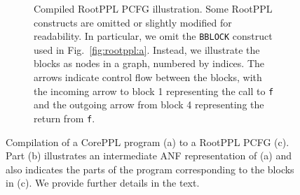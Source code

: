\documentclass[runningheads]{llncs}
\newcommand{\rlstinline}{\lstinline[language=RootPPL]}
\begin{document}
\begin{figure}[tbp]
\begin{subfigure}[c]{\columnwidth}
{
    }
    \ifthesis\vspace{-1mm}\fi
      \caption{%
        Compiled RootPPL PCFG illustration.
        Some RootPPL constructs are omitted or slightly modified for readability.
        In particular, we omit the \rlstinline{BBLOCK} construct used in Fig.~\ref{fig:rootppl:a}.
        Instead, we illustrate the blocks as nodes in a graph, numbered by indices.
        The arrows indicate control flow between the blocks, with the incoming arrow to block 1 representing the call to \lstinline!f! and the outgoing arrow from block 4 representing the return from \lstinline!f!.
      }
    \label{fig:example:c}
  \end{subfigure}
  \ifthesis\vspace{-2mm}\fi
  \caption{%
    Compilation of a CorePPL program (a) to a RootPPL PCFG (c).
    Part (b) illustrates an intermediate ANF representation of (a) and also indicates the parts of the program corresponding to the blocks in (c).
    We provide further details in the text.
  }
  \label{fig:example}
\end{figure}
\end{document}
